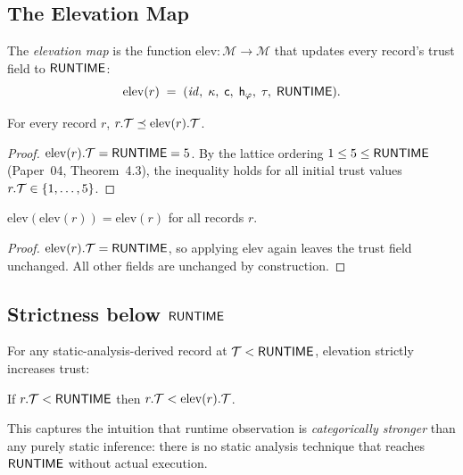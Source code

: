 \documentclass[11pt]{article}
\newcommand{\elevate}{\mathrm{elev}}             %
\newcommand{\Epoch}{\tau}                        %
\newcommand{\PropHash}{\mathsf{h}_\varphi}       %
\newcommand{\MutLog}{\mathcal{M}}                %
\begin{document}
\subsection{The Elevation Map}
\label{subsec:elevation}

\begin{definition}
\label{def:elevation}
The \emph{elevation map} is the function
$\elevate : \MutLog \to \MutLog$ that updates every record's trust
field to $\mathsf{RUNTIME}$:
\[
  \elevate(r) \;=\;
  (\mathit{id},\;\kappa,\;\coord,\;\PropHash,\;\Epoch,\;\Truntime).
\]
\end{definition}

\begin{proposition}
\label{prop:elevation-monotone}
For every record $r$, $r.\trust \tleq \elevate(r).\trust$.
\end{proposition}
\begin{proof}
$\elevate(r).\trust = \Truntime = 5$.  By the lattice ordering
$1 \leq 5 \leq \mathsf{RUNTIME}$ (Paper~04, Theorem~4.3), the inequality
holds for all initial trust values $r.\mathcal{T} \in \{1,\ldots,5\}$.
\end{proof}

\begin{proposition}
\label{prop:elevation-idempotent}
$\elevate(\elevate(r)) = \elevate(r)$ for all records $r$.
\end{proposition}
\begin{proof}
$\elevate(r).\trust = \Truntime$, so applying $\elevate$ again
leaves the trust field unchanged.  All other fields are unchanged by
construction.
\end{proof}

\subsection{Strictness below $\mathsf{RUNTIME}$}
\label{subsec:strict}

For any static-analysis-derived record at $\mathcal{T} < \mathsf{RUNTIME}$,
elevation strictly increases trust:

\begin{proposition}
\label{prop:strict}
If $r.\mathcal{T} < \mathsf{RUNTIME}$ then $r.\trust < \elevate(r).\trust$.
\end{proposition}

This captures the intuition that runtime observation is
\emph{categorically stronger} than any purely static inference: there
is no static analysis technique that reaches $\mathsf{RUNTIME}$ without
actual execution.
\end{document}
